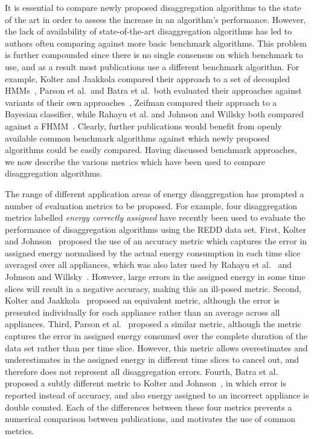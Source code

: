 \documentclass{sig-alternate}
\begin{document}
It is essential to compare newly proposed disaggregation algorithms to the state of the art in order to assess the increase in an algorithm's performance. However, the lack of availability of state-of-the-art disaggregation algorithms has led to authors often comparing against more basic benchmark algorithms. This problem is further compounded since there is no single consensus on which benchmark to use, and as a result most publications use a different benchmark algorithm. For example, Kolter and Jaakkola compared their approach to a set of decoupled HMMs~\cite{kolter_2012}, Parson et al.\ and Batra et al.\ both evaluated their approaches against variants of their own approaches~\cite{parson_2012,batra_2013}, Zeifman compared their approach to a Bayesian classifier, while Rahayu et al. and Johnson and Willsky both compared against a FHMM~\cite{rahayu_2012,johnson_2013}. Clearly, further publications would benefit from openly available common benchmark algorithms against which newly proposed algorithms could be easily compared. Having discussed benchmark approaches, we now describe the various metrics which have been used to compare disaggregation algorithms.

The range of different application areas of energy disaggregation has prompted a number of evaluation metrics to be proposed. For example, four disaggregation metrics labelled \emph{energy correctly assigned} have recently been used to evaluate the performance of disaggregation algorithms using the REDD data set. First, Kolter and Johnson~\cite{redd} proposed the use of an accuracy metric which captures the error in assigned energy normalised by the actual energy consumption in each time slice averaged over all appliances, which was also later used by Rahayu et al.~\cite{rahayu_2012} and Johnson and Willsky~\cite{johnson_2013}. However, large errors in the assigned energy in some time slices will result in a negative accuracy, making this an ill-posed metric. Second, Kolter and Jaakkola~\cite{kolter_2012} proposed an equivalent metric, although the error is presented individually for each appliance rather than an average across all appliances. Third, Parson et al.~\cite{parson_2012} proposed a similar metric, although the metric captures the error in assigned energy consumed over the complete duration of the data set rather than per time slice. However, this metric allows overestimates and underestimates in the assigned energy in different time slices to cancel out, and therefore does not represent all disaggregation errors. Fourth, Batra et al.~\cite{batra_2013} proposed a subtly different metric to Kolter and Johnson~\cite{redd}, in which error is reported instead of accuracy, and also energy assigned to an incorrect appliance is double counted. Each of the differences between these four metrics prevents a numerical comparison between publications, and motivates the use of common metrics.
\end{document}
